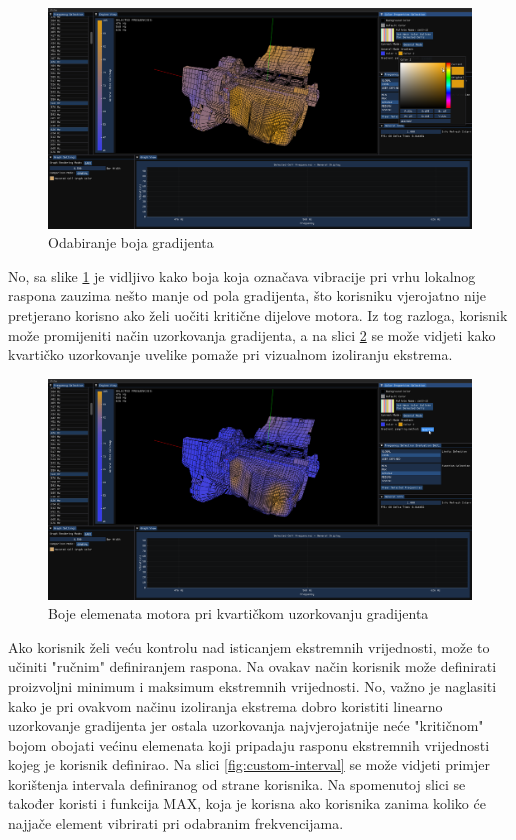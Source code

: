\documentclass[times, utf8, diplomski]{fer}
\begin{document}
\begin{figure} [H]
	\centering
    \includegraphics[width=\textwidth]{demonstration/color_select.png}
    \caption{Odabiranje boja gradijenta}
    \label{fig:color-select}
\end{figure}

No, sa slike \ref{fig:color-select} je vidljivo kako boja koja označava vibracije pri vrhu lokalnog raspona zauzima nešto manje od pola gradijenta, što korisniku vjerojatno nije pretjerano korisno ako želi uočiti kritične dijelove motora. Iz tog razloga, korisnik može promijeniti način uzorkovanja gradijenta, a na slici \ref{fig:quartic-engine-colors} se može vidjeti kako kvartičko uzorkovanje uvelike pomaže pri vizualnom izoliranju ekstrema.

\begin{figure} [H]
	\centering
    \includegraphics[width=\textwidth]{demonstration/quartic_sampling_normal_mode.png}
    \caption{Boje elemenata motora pri kvartičkom uzorkovanju gradijenta}
    \label{fig:quartic-engine-colors}
\end{figure}

Ako korisnik želi veću kontrolu nad isticanjem ekstremnih vrijednosti, može to učiniti "ručnim" definiranjem raspona. Na ovakav način korisnik može definirati proizvoljni minimum i maksimum ekstremnih vrijednosti. No, važno je naglasiti kako je pri ovakvom načinu izoliranja ekstrema dobro koristiti linearno uzorkovanje gradijenta jer ostala uzorkovanja najvjerojatnije neće "kritičnom" bojom obojati većinu elemenata koji pripadaju rasponu ekstremnih vrijednosti kojeg je korisnik definirao. Na slici \ref{fig:custom-interval} se može vidjeti primjer korištenja intervala definiranog od strane korisnika. Na spomenutoj slici se također koristi i funkcija MAX, koja je korisna ako korisnika zanima koliko će najjače element vibrirati pri odabranim frekvencijama.
\end{document}
